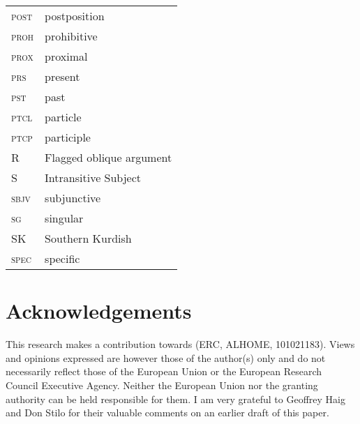 \documentclass[output=paper,colorlinks,citecolor=brown]{langscibook}
\begin{document}
\begin{sloppypar}
\begin{tabularx}{.5\textwidth}{@{}lQ@{}}
\textsc{post} & postposition \\
\textsc{proh} & prohibitive \\
\textsc{prox} & proximal \\
\textsc{prs} & present \\
\textsc{pst} & past \\
\textsc{ptcl} & particle \\
\textsc{ptcp} & participle \\
R& Flagged {oblique} {argument}\\
S & Intransitive Subject \\
\textsc{sbjv} & subjunctive \\
\textsc{sg} & singular \\
SK & Southern Kurdish \\
\textsc{spec} & specific \\
\end{tabularx}

\section*{Acknowledgements}
This research makes a contribution towards (ERC, ALHOME, 101021183). Views and opinions expressed are however those of the author(s) only and do not necessarily reflect those of the European Union or the European Research Council Executive Agency. Neither the European Union nor the granting authority can be held responsible for them. I am very grateful to Geoffrey Haig and Don Stilo for their valuable comments on an earlier draft of this paper. 


\sloppy
\printbibliography[heading=subbibliography,notkeyword=this]

\end{sloppypar}
\end{document}
